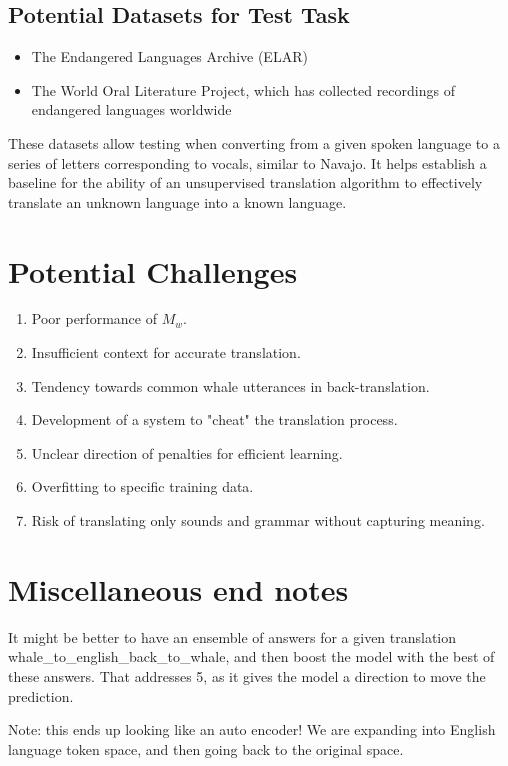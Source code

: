\documentclass{article}
\begin{document}
\subsection{Potential Datasets for Test Task}
\begin{itemize}
    \item The Endangered Languages Archive (ELAR)
    \item The World Oral Literature Project, which has collected recordings of endangered languages worldwide
\end{itemize}

These datasets allow testing when converting from a given spoken language to a series of letters corresponding to vocals, similar to Navajo. It helps establish a baseline for the ability of an unsupervised translation algorithm to effectively translate an unknown language into a known language.
\section{Potential Challenges}
\begin{enumerate}
    \item Poor performance of $M_w$.
    \item Insufficient context for accurate translation.
    \item Tendency towards common whale utterances in back-translation.
    \item Development of a system to "cheat" the translation process.
    \item Unclear direction of penalties for efficient learning.
    \item Overfitting to specific training data.
    \item Risk of translating only sounds and grammar without capturing meaning.
\end{enumerate}
\section{Miscellaneous end notes}

It might be better to have an ensemble of answers for a given translation whale\_to\_english\_back\_to\_whale, and then boost the model with the best of these answers. That addresses 5, as it gives the model a direction to move the prediction.

Note: this ends up looking like an auto encoder! We are expanding into English language token space, and then going back to the original space.
\end{document}
